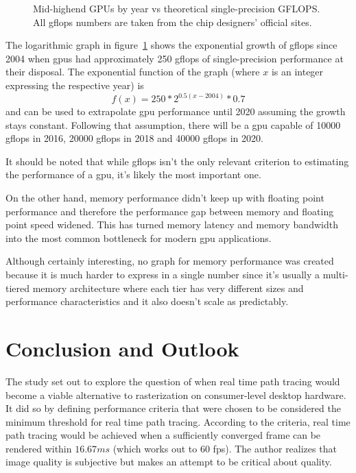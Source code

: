 \documentclass[
  twoside,
  11pt, a4paper,
  footinclude=true,
  headinclude=true,
  cleardoublepage=empty
]{scrreprt}
\begin{document}
\begin{figure}[H]
    \centering
    \caption{Mid-highend GPUs by year vs theoretical single-precision GFLOPS.
    All \ac{gflops} numbers are taken from the chip designers' official sites.}
    \label{fig:gpus-by-year}
\end{figure}

The logarithmic graph in figure~\ref{fig:gpus-by-year} shows the exponential growth of \ac{gflops} since 2004
when \acp{gpu} had approximately 250 \ac{gflops} of single-precision performance at their disposal.
The exponential function of the graph
(where \(x\) is an integer expressing the respective year) is
\[ f(x) = 250 * 2 ^ {0.5 (x-2004)} * 0.7 \]
and can be used to extrapolate \ac{gpu} performance until 2020 assuming the growth stays constant.
Following that assumption, there will be a \ac{gpu} capable of 10000 \ac{gflops} in 2016, 20000
\ac{gflops} in 2018 and 40000 \ac{gflops} in 2020.

It should be noted that while \ac{gflops} isn't the only relevant criterion to estimating the
performance of a \ac{gpu}, it's likely the most important one.

On the other hand, memory performance didn't keep up with floating point performance and therefore
the performance gap between memory and floating point speed widened. This has turned memory latency
and memory bandwidth into the most common bottleneck for modern \ac{gpu} applications.

Although certainly interesting, no graph for memory performance was created because
it is much harder to express in a single number since it's usually
a multi-tiered memory architecture where each tier has very different sizes
and performance characteristics and it also doesn't scale as predictably.

\chapter{Conclusion and Outlook}
The study set out to explore the question of when real time path tracing would become
a viable alternative to rasterization on consumer-level desktop hardware. It did so by defining
performance criteria that were chosen to be considered the minimum threshold for real time path tracing.
According to the criteria, real time path tracing would be achieved when a sufficiently converged
frame can be rendered within \(16.67ms\) (which works out to 60 \ac{fps}). The author realizes that
image quality is subjective but makes an attempt to be critical about quality.
\end{document}
